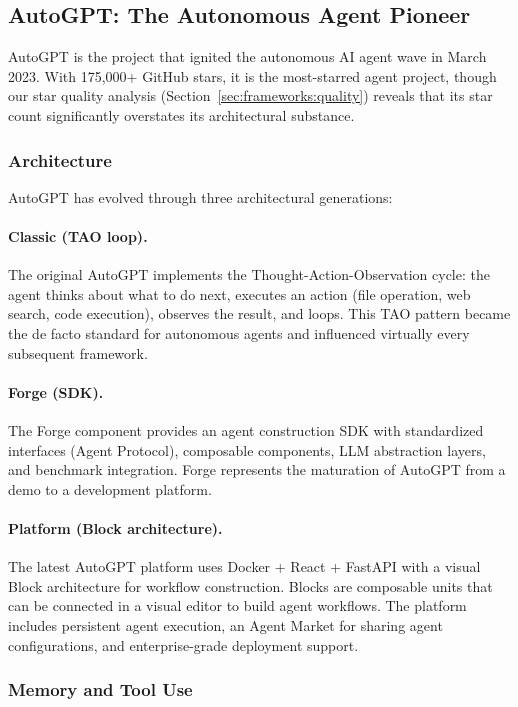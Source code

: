 \subsection{AutoGPT: The Autonomous Agent Pioneer}

AutoGPT is the project that ignited the autonomous AI agent wave in March 2023. With 175,000+ GitHub stars, it is the most-starred agent project, though our star quality analysis (Section~\ref{sec:frameworks:quality}) reveals that its star count significantly overstates its architectural substance.

\subsubsection{Architecture}

AutoGPT has evolved through three architectural generations:

\paragraph{Classic (TAO loop).}
The original AutoGPT implements the Thought-Action-Observation cycle: the agent thinks about what to do next, executes an action (file operation, web search, code execution), observes the result, and loops. This TAO pattern became the de facto standard for autonomous agents and influenced virtually every subsequent framework.

\paragraph{Forge (SDK).}
The Forge component provides an agent construction SDK with standardized interfaces (Agent Protocol), composable components, LLM abstraction layers, and benchmark integration. Forge represents the maturation of AutoGPT from a demo to a development platform.

\paragraph{Platform (Block architecture).}
The latest AutoGPT platform uses Docker + React + FastAPI with a visual Block architecture for workflow construction. Blocks are composable units that can be connected in a visual editor to build agent workflows. The platform includes persistent agent execution, an Agent Market for sharing agent configurations, and enterprise-grade deployment support.

\subsubsection{Memory and Tool Use}

